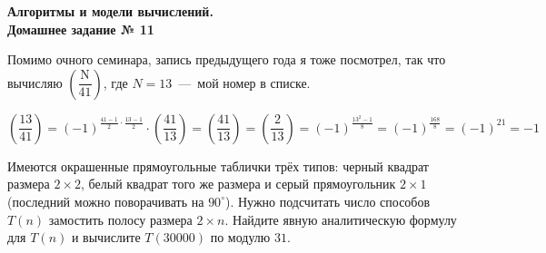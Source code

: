 \documentclass[a4paper,12pt]{article}
\begin{document}
	
	\thispagestyle{firstpage}
	
	\begin{center}
		\textbf{\Large{Алгоритмы и модели вычислений. \\ Домашнее задание № 11}}
	\end{center}
	
	
\begin{tasknum}{0}
	Помимо очного семинара, запись предыдущего года я тоже посмотрел, так что вычисляю $\left(\dfrac{\text{N}}{41}\right)$, где $N=13$~---~мой номер в списке.
\end{tasknum}
	
\begin{solution}
	\[\left(\dfrac{13}{41}\right) = \left(-1\right)^{\frac{41 - 1}{2} \cdot \frac{13 - 1}{2}} \cdot \left(\dfrac{41}{13}\right) = \left(\dfrac{41}{13}\right) = \left(\dfrac{2}{13}\right) = (-1)^{\frac{13^2-1}{8}} = (-1)^{\frac{168}{8}} = (-1)^{21} = -1\]
\end{solution}	

\begin{task}
	Имеются окрашенные прямоугольные таблички трёх типов: черный квадрат размера $2\times 2$, белый квадрат того же размера и серый прямоугольник $2\times 1$ (последний можно поворачивать на $90^\circ$). Нужно подсчитать число способов $T(n)$ замостить полосу размера $2\times n$. Найдите явную аналитическую формулу для $T(n)$ и вычислите $T(30000)$ по модулю $31$. 
\end{task}
\end{document}
